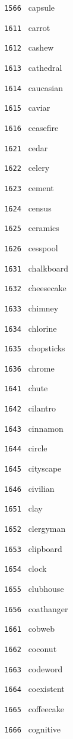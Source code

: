 \documentclass[11pt]{article}
\begin{document}
\begin{multicols}{6}
\noindent \texttt{ 1566 } capsule  \par
\noindent \texttt{ 1611 } carrot  \par
\noindent \texttt{ 1612 } cashew  \par
\noindent \texttt{ 1613 } cathedral  \par
\noindent \texttt{ 1614 } caucasian  \par
\noindent \texttt{ 1615 } caviar  \par
\noindent \texttt{ 1616 } ceasefire  \par
\vspace{3mm}
\noindent \texttt{ 1621 } cedar  \par
\noindent \texttt{ 1622 } celery  \par
\noindent \texttt{ 1623 } cement  \par
\noindent \texttt{ 1624 } census  \par
\noindent \texttt{ 1625 } ceramics  \par
\noindent \texttt{ 1626 } cesspool  \par
\vspace{3mm}
\noindent \texttt{ 1631 } chalkboard  \par
\noindent \texttt{ 1632 } cheesecake  \par
\noindent \texttt{ 1633 } chimney  \par
\noindent \texttt{ 1634 } chlorine  \par
\noindent \texttt{ 1635 } chopsticks  \par
\noindent \texttt{ 1636 } chrome  \par
\vspace{3mm}
\noindent \texttt{ 1641 } chute  \par
\noindent \texttt{ 1642 } cilantro  \par
\noindent \texttt{ 1643 } cinnamon  \par
\noindent \texttt{ 1644 } circle  \par
\noindent \texttt{ 1645 } cityscape  \par
\noindent \texttt{ 1646 } civilian  \par
\vspace{3mm}
\noindent \texttt{ 1651 } clay  \par
\noindent \texttt{ 1652 } clergyman  \par
\noindent \texttt{ 1653 } clipboard  \par
\noindent \texttt{ 1654 } clock  \par
\noindent \texttt{ 1655 } clubhouse  \par
\noindent \texttt{ 1656 } coathanger  \par
\vspace{3mm}
\noindent \texttt{ 1661 } cobweb  \par
\noindent \texttt{ 1662 } coconut  \par
\noindent \texttt{ 1663 } codeword  \par
\noindent \texttt{ 1664 } coexistent  \par
\noindent \texttt{ 1665 } coffeecake  \par
\noindent \texttt{ 1666 } cognitive  \par
\end{multicols}
\end{document}
